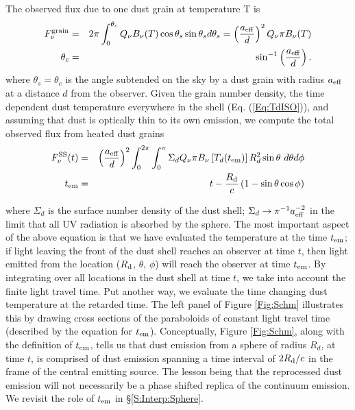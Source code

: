 The observed flux due to one dust grain at temperature T is
\begin{eqnarray}
F^{\rm{grain}}_{\nu} &=& 2 \pi \int^{\theta_c}_0{ Q_{\nu} B_{\nu}(T) \cos{\theta_s} \sin{\theta_s} d \theta_s} = \left(\frac{ a_{\rm{eff}} }{d}\right)^2 Q_{\nu} \pi B_{\nu}(T) \\ \nonumber  
\theta_c &=& \sin^{-1}\left( \frac{ a_{\rm{eff}}}{d}\right) .
\end{eqnarray}
where $\theta_s = \theta_c$ is the angle subtended on the sky by a dust grain
with radius $ a_{\rm{eff}}$ at a distance $d$ from the observer. Given the
grain number density, the time dependent dust temperature everywhere in the
shell (Eq. (\ref{Eq:TdISO})), and assuming that dust is
optically thin to its own emission, we compute the total observed flux from
heated dust grains
\begin{eqnarray}
\label{Eq:FnuSS}
 F^{\rm SS}_{\nu}(t) &=& \left(\frac{ a_{\rm{eff}} }{d}\right)^2 \int^{2 \pi}_{0}{\int^{\pi}_{0}{ \Sigma_d Q_{\nu}  \pi B_{\nu}\left[T_d(t_{\em})\right]  R^2_d \sin{\theta} \ d \theta d\phi }}   \\ \nonumber 
t_{\em}& =& t - \frac{\Rin}{c} \left( 1 - \sin{\theta} \cos{\phi}\right)  
\end{eqnarray}

where $\Sigma_d$ is the surface number density of the dust shell; $\Sigma_d
\rightarrow \pi^{-1} a^{-2}_{\eff}$ in the limit that all UV radiation is
absorbed by the sphere. The most important aspect of the above equation is
that we have evaluated the temperature at the time $t_{\em}$; if light leaving
the front of the dust shell reaches an observer at time $t$, then light
emitted from the location ($\Rin$, $\theta$, $\phi$) will reach the observer
at time $t_{\em}$. By integrating over all locations in the dust shell at time
$t$, we take into account the finite light travel time. Put another way, we
evaluate the time changing dust temperature at the retarded time. The left
panel of Figure \ref{Fig:Schm} illustrates this by drawing cross sections of
the paraboloids of constant light travel time (described by the equation for
$t_{\em}$). Conceptually, Figure \ref{Fig:Schm}, along with the definition of
$t_{\em}$, tells us that dust emission from a sphere of radius $R_d$, at time
$t$, is comprised of dust emission spanning a time interval of $2 \Rin /c$ in
the frame of the central emitting source. The lesson being that the
reprocessed dust emission will not necessarily be a phase shifted replica of
the continuum emission. We revisit the role of $t_{\em}$ in \S \ref{S:Interp:Sphere}.


